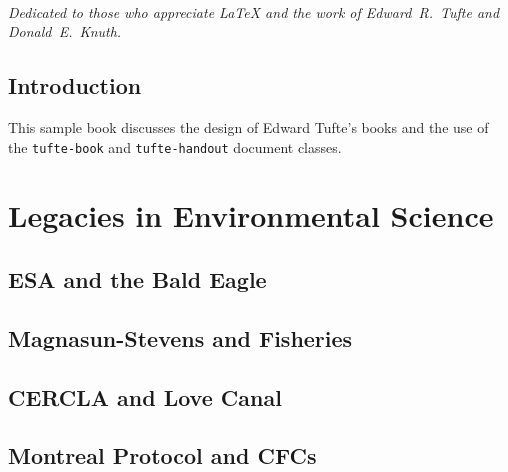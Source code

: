 \documentclass{tufte-book}\usepackage[]{graphicx}\usepackage[]{xcolor}
\newcommand{\doccls}[1]{\texttt{#1}}%
\begin{document}
\tableofcontents

\listoffigures

\listoftables

\cleardoublepage
~\vfill
\begin{doublespace}
\noindent\fontsize{18}{22}\selectfont\itshape
\nohyphenation
Dedicated to those who appreciate \LaTeX{}
and the work of \mbox{Edward R.~Tufte}
and \mbox{Donald E.~Knuth}.
\end{doublespace}
\vfill
\vfill


\cleardoublepage


\chapter*{Introduction}

This sample book discusses the design of Edward Tufte's
books\citep{Tufte2001,Tufte1990,Tufte1997,Tufte2006}
and the use of the \doccls{tufte-book} and \doccls{tufte-handout} document classes.





\mainmatter



\part{Legacies in Environmental Science}









\chapter{ESA and the Bald Eagle}

\chapter{Magnasun-Stevens and Fisheries}

\chapter{CERCLA and Love Canal}

\chapter{Montreal Protocol and CFCs}
\end{document}
